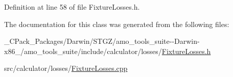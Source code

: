 Definition at line 58 of file Fixture\+Losses.\+h.



The documentation for this class was generated from the following files\+:\begin{DoxyCompactItemize}
\item 
\+\_\+\+C\+Pack\+\_\+\+Packages/\+Darwin/\+S\+T\+G\+Z/amo\+\_\+tools\+\_\+suite-\/-\/\+Darwin-\/x86\+\_/amo\+\_\+tools\+\_\+suite/include/calculator/losses/\hyperlink{___c_pack___packages_2_darwin_2_s_t_g_z_2amo__tools__suite--_darwin-x86__64_2amo__tools__suite_213ce320545ff913138db2e645210ad8a}{Fixture\+Losses.\+h}\item 
src/calculator/losses/\hyperlink{_fixture_losses_8cpp}{Fixture\+Losses.\+cpp}\end{DoxyCompactItemize}
